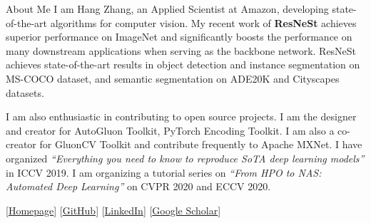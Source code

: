 \documentclass{resume} %
\begin{document}
\begin{rSection}{About Me}
I am Hang Zhang, an Applied Scientist at Amazon, developing state-of-the-art algorithms for computer vision. 
My recent work of {\bf ResNeSt} achieves superior performance on ImageNet and significantly boosts the performance on many downstream applications when serving as the backbone network. ResNeSt achieves state-of-the-art results in object detection and instance segmentation on MS-COCO dataset, and semantic segmentation on ADE20K and Cityscapes datasets.

I am also enthusiastic in contributing to open source projects. I am the designer and creator for AutoGluon Toolkit, PyTorch Encoding Toolkit. I am also a co-creator for GluonCV Toolkit and contribute frequently to Apache MXNet. I have organized {\it ``Everything you need to know to reproduce SoTA deep learning models''} in ICCV 2019.
I am organizing a tutorial series on {\it``From HPO to NAS: Automated Deep Learning''} on CVPR 2020 and ECCV 2020. 


[\href{https://hangzhang.org/}{Homepage}] [\href{https://github.com/zhanghang1989}{GitHub}] 
[\href{https://www.linkedin.com/in/zhanghang0704}{LinkedIn}] 
[\href{https://scholar.google.com/citations?user=gCoWdkUAAAAJ}{Google Scholar}]
\end{rSection}


\newcommand{\RNum}[1]{\uppercase\expandafter{\romannumeral #1\relax}}
\end{document}
